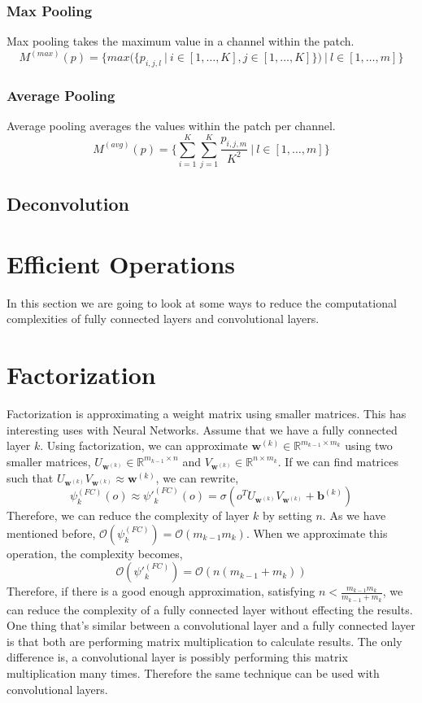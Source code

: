 \subsubsection{Max Pooling}
Max pooling takes the maximum value in a channel within the patch.
$$ M^{(max)}(p) = \bigg\{max\big(\{p_{i,j,l} \ |\  i \in [1, \ldots, K],  j \in [1, \ldots, K] \}\big) \ |\  l \in [1, \ldots, m] \bigg\} $$
\subsubsection{Average Pooling}
Average pooling averages the values within the patch per channel. 
$$ M^{(avg)}(p) = \{\sum_{i=1}^{K}\sum_{j=1}^{K}\frac{p_{i,j,m}}{K^2} \ | \  l \in [1, \ldots, m] \} $$

\subsection{Deconvolution}

\section{Efficient Operations}
In this section we are going to look at some ways to reduce the computational complexities of fully connected layers and convolutional layers. 

\section{Factorization}
Factorization is approximating a weight matrix using smaller matrices. This has interesting uses with Neural Networks. Assume that we have a fully connected layer $k$. Using factorization, we can approximate $\mathbf{w}^{(k)} \in \mathbb{R}^{m_{k-1} \times m_k}$ using two smaller matrices, $U_{\mathbf{w}^{(k)}} \in \mathbb{R}^{m_{k-1} \times n}$ and $V_{\mathbf{w}^{(k)}} \in \mathbb{R}^{n \times m_{k}}$. If we can find matrices such that $U_{\mathbf{w}^{(k)}}V_{\mathbf{w}^{(k)}} \approx \mathbf{w}^{(k)}$, we can rewrite, 
$$\psi^{(FC)}_k(o) \approx \psi'^{(FC)}_k(o) = \sigma(o^T U_{\mathbf{w}^{(k)}}V_{\mathbf{w}^{(k)}} +\mathbf{b}^{(k)})$$
Therefore, we can reduce the complexity of layer $k$ by setting $n$. As we have mentioned before, $\mathcal{O}(\psi_k^{(FC)}) = \mathcal{O}(m_{k-1}m_k)$. When we approximate this operation, the complexity becomes, 
$$\mathcal{O}(\psi'^{(FC)}_k) = \mathcal{O}(n(m_{k-1}+m_k))$$
Therefore, if there is a good enough approximation, satisfying $n < \frac{m_{k-1}m_k}{m_{k-1}+m_k}$, we can reduce the complexity of a fully connected layer without effecting the results.
One thing that's similar between a convolutional layer and a fully connected layer is that both are performing matrix multiplication to calculate results. The only difference is, a convolutional layer is possibly performing this matrix multiplication many times. Therefore the same technique can be used with convolutional layers. 


